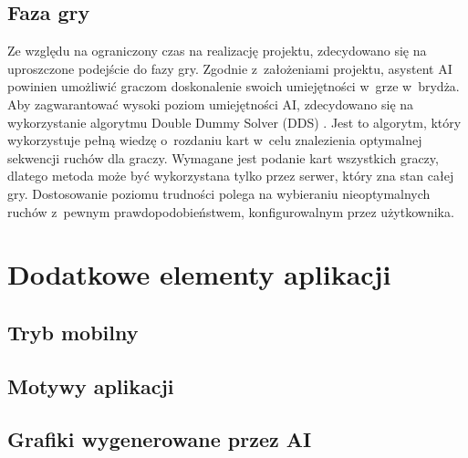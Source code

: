\FloatBarrier

\subsection{Faza gry}

Ze względu na ograniczony czas na realizację projektu,
zdecydowano się na uproszczone podejście do fazy gry.
Zgodnie z~założeniami projektu, asystent AI powinien umożliwić
graczom doskonalenie swoich umiejętności w~grze w~brydża.
Aby zagwarantować wysoki poziom umiejętności AI, zdecydowano się
na wykorzystanie algorytmu Double Dummy Solver (DDS) \cite{DDS}.
Jest to algorytm, który wykorzystuje pełną wiedzę o~rozdaniu kart
w~celu znalezienia optymalnej sekwencji ruchów dla graczy.
Wymagane jest podanie kart wszystkich graczy, dlatego
metoda może być wykorzystana tylko przez serwer, który zna stan całej gry.
Dostosowanie poziomu trudności polega na wybieraniu nieoptymalnych ruchów
z~pewnym prawdopodobieństwem, konfigurowalnym przez użytkownika.

\section{Dodatkowe elementy aplikacji}

\subsection{Tryb mobilny}

\subsection{Motywy aplikacji}

\subsection{Grafiki wygenerowane przez AI}
